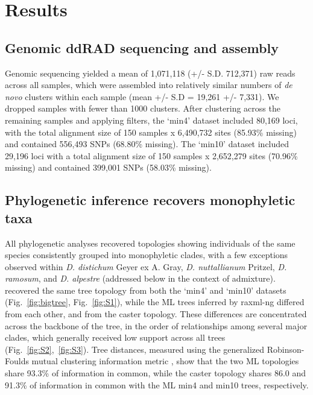 \documentclass[11pt]{article}
\begin{document}
\section{Results}
\subsection{Genomic ddRAD sequencing and assembly}
Genomic sequencing yielded a mean of 1,071,118 (+/- S.D. 712,371) raw reads 
across all samples, which were assembled into relatively similar numbers of 
\emph{de novo} clusters within each sample (mean +/- S.D = 19,261 +/- 7,331). 
% 
We dropped samples with fewer than 1000 clusters. 
After clustering across the remaining samples and applying filters, 
the `min4' dataset included 80,169 loci, with the total alignment size of
150 samples x 6,490,732 sites (85.93\% missing) and contained 556,493 
SNPs (68.80\% missing). 
The `min10' dataset included 29,196 loci with a total alignment size of 
150 samples x 2,652,279 sites (70.96\% missing) and contained 399,001 SNPs
(58.03\% missing).


\subsection{Phylogenetic inference recovers monophyletic taxa}

All phylogenetic analyses recovered topologies showing individuals of the same 
species consistently grouped into monophyletic clades, with a few exceptions 
observed within \emph{D. distichum} Geyer ex A. Gray, \emph{D. nuttallianum} Pritzel, 
\emph{D. ramosum}, and \emph{D. alpestre} (addressed below in the context of admixture).
% 
\Caster recovered the same tree topology from both the `min4' and `min10' 
datasets (Fig.~\ref{fig:bigtree}, Fig.~\ref{fig:S1}), while the ML trees
inferred by raxml-ng differed from each other, and from the caster topology.
% 
These differences are concentrated across the backbone of the tree, in the 
order of relationships among several major clades, which generally received
low support across all trees
(Fig.~\ref{fig:S2},~\ref{fig:S3}).
% 
Tree distances, measured using the generalized Robinson-Foulds mutual clustering
information metric \citep[MCI;][]{smith_information_2020}, show that the two
ML topologies share 93.3\% of information in common, while the caster topology
shares 86.0 and 91.3\% of information in common with the ML min4 and min10 
trees, respectively.
\end{document}
